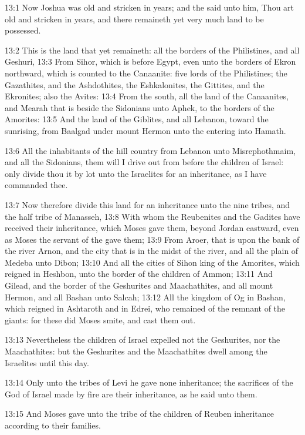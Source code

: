 13:1 Now Joshua was old and stricken in years; and the \LORD said unto
him, Thou art old and stricken in years, and there remaineth yet very
much land to be possessed.

13:2 This is the land that yet remaineth: all the borders of the
Philistines, and all Geshuri, 13:3 From Sihor, which is before Egypt,
even unto the borders of Ekron northward, which is counted to the
Canaanite: five lords of the Philistines; the Gazathites, and the
Ashdothites, the Eshkalonites, the Gittites, and the Ekronites; also
the Avites: 13:4 From the south, all the land of the Canaanites, and
Mearah that is beside the Sidonians unto Aphek, to the borders of the
Amorites: 13:5 And the land of the Giblites, and all Lebanon, toward
the sunrising, from Baalgad under mount Hermon unto the entering into
Hamath.

13:6 All the inhabitants of the hill country from Lebanon unto
Misrephothmaim, and all the Sidonians, them will I drive out from
before the children of Israel: only divide thou it by lot unto the
Israelites for an inheritance, as I have commanded thee.

13:7 Now therefore divide this land for an inheritance unto the nine
tribes, and the half tribe of Manasseh, 13:8 With whom the Reubenites
and the Gadites have received their inheritance, which Moses gave
them, beyond Jordan eastward, even as Moses the servant of the \LORD
gave them; 13:9 From Aroer, that is upon the bank of the river Arnon,
and the city that is in the midst of the river, and all the plain of
Medeba unto Dibon; 13:10 And all the cities of Sihon king of the
Amorites, which reigned in Heshbon, unto the border of the children of
Ammon; 13:11 And Gilead, and the border of the Geshurites and
Maachathites, and all mount Hermon, and all Bashan unto Salcah; 13:12
All the kingdom of Og in Bashan, which reigned in Ashtaroth and in
Edrei, who remained of the remnant of the giants: for these did Moses
smite, and cast them out.

13:13 Nevertheless the children of Israel expelled not the Geshurites,
nor the Maachathites: but the Geshurites and the Maachathites dwell
among the Israelites until this day.

13:14 Only unto the tribes of Levi he gave none inheritance; the
sacrifices of the \LORD God of Israel made by fire are their
inheritance, as he said unto them.

13:15 And Moses gave unto the tribe of the children of Reuben
inheritance according to their families.

